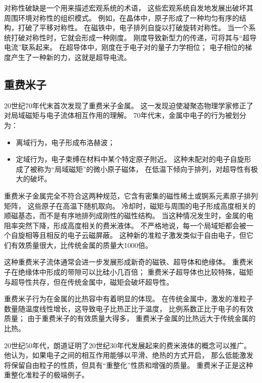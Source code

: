 \documentclass{article}
\begin{document}
对称性破缺是一个用来描述宏观系统的术语，
这些宏观系统自发地发展出破坏其周围环境对称性的组织模式。
例如，在晶体中，原子形成了一种均匀有序的结构，打破了平移对称性。
在磁铁中，电子排列自旋以打破旋转对称性。
当一个系统打破对称性时，它就会形成一种刚度。
刚度导致新型力的传递，可将其与“超导电流”联系起来。
在超导体中，刚度在于电子对的量子力学相位；
电子相位的梯度产生了一种新的力，这就是超导电流。

\subsection{重费米子}

20世纪70年代末首次发现了重费米子金属。
这一发现迫使凝聚态物理学家修正了对局域磁矩与电子流体相互作用的理解。
70年代末，金属中电子的行为被划分为：
\begin{itemize}
    \item 离域行为，电子形成布洛赫波；
    \item 定域行为，电子束缚在材料中某个特定原子附近。
    这种未配对的电子自旋形成了被称为“局域磁矩”的微小原子磁体，
    在低温下倾向于排列，对超导性有极大的破坏。
\end{itemize}

重费米子金属完全不符合这两种规范，它含有密集的磁性稀土或锕系元素原子排列矩阵，
这些原子在高温下随机取向。
冷却时，磁矩与周围的电子形成高度相关的顺磁基态，而不是有序地排列成刚性的磁性结构。
当这种情况发生时，金属的电阻率突然下降，形成高度相关的费米液体。
不严格地说，每一个局域矩都会被一个自旋相等且相反的电子云磁屏蔽。
这种新的准粒子激发类似于自由电子，但它们有效质量很大，比传统金属的质量大1000倍。 

这种重费米子流体通常会进一步发展形成新奇的磁铁、超导体和绝缘体。
重费米子在绝缘体中形成的带隙可以比硅小几百倍；
重费米子超导体也比较特殊，磁矩与超导性共存，但在传统金属中，磁矩会破坏超导性。

重费米子行为在金属的比热容中有着明显的体现。
在传统金属中，激发的准粒子数量随温度线性增长，这导致电子比热正比于温度，
比例系数正比于电子的有效质量；
由于重费米子的有效质量大得多，
重费米子金属的比热远大于传统金属的比热。

20世纪50年代，朗道证明了20世纪30年代发展起来的费米液体的概念可以推广。
他认为，如果电子之间的相互作用能够以平滑、绝热的方式开启，
那么低能激发将保留自由粒子的性质，但具有“重整化”性质和增强的质量。
重费米子正是这种重整化准粒子的极端例子。 
\end{document}
